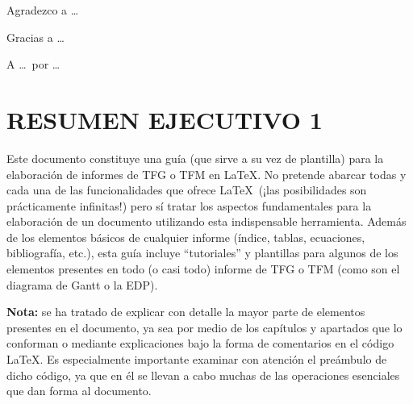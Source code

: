 \documentclass[a4paper, 11pt, spanish, twoside]{article}
\newcommand\blankpage{%
    \null
    \thispagestyle{empty}%
    \newpage}
\begin{document}
Agradezco a \dots

Gracias a \dots

A \dots \ por \dots

\afterpage{\blankpage} %




\newpage
\section*{RESUMEN EJECUTIVO 1} %

Este documento constituye una guía (que sirve a su vez de plantilla) para la elaboración de informes de TFG o TFM en \LaTeX. No pretende abarcar todas y cada una de las funcionalidades que ofrece \LaTeX \ (¡las posibilidades son prácticamente infinitas!) pero sí tratar los aspectos fundamentales para la elaboración de un documento utilizando esta indispensable herramienta. Además de los elementos básicos de cualquier informe (índice, tablas, ecuaciones, bibliografía, etc.), esta guía incluye ``tutoriales'' y plantillas para algunos de los elementos presentes en todo (o casi todo) informe de TFG o TFM (como son el diagrama de Gantt o la EDP). 

\textbf{Nota:} se ha tratado de explicar con detalle la mayor parte de elementos presentes en el documento, ya sea por medio de los capítulos y apartados que lo conforman o mediante explicaciones bajo la forma de comentarios en el código \LaTeX. Es especialmente importante examinar con atención el preámbulo de dicho código, ya que en él se llevan a cabo muchas de las operaciones esenciales que dan forma al documento.
\end{document}

